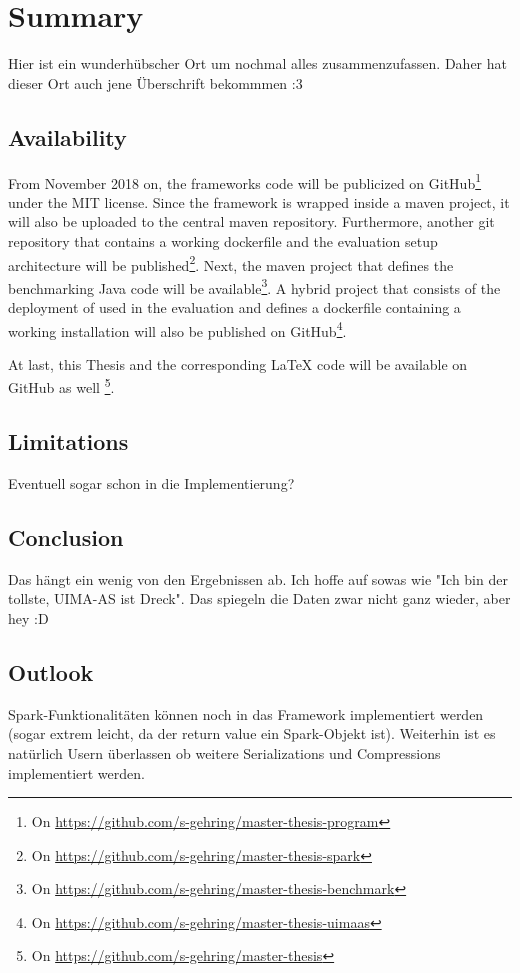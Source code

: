 \chapter{Summary}\label{ch:summary}



Hier ist ein wunderhübscher Ort um nochmal alles zusammenzufassen. Daher hat dieser Ort auch jene Überschrift bekommmen :3


\section{Availability}
From November 2018 on, the frameworks code will be publicized on GitHub\footnote{On \url{https://github.com/s-gehring/master-thesis-program}} under the MIT license. Since the framework is wrapped inside a maven project, it will also be uploaded to the central maven repository. Furthermore, another git repository that contains a working \spark{} dockerfile and the evaluation setup architecture will be published\footnote{On \url{https://github.com/s-gehring/master-thesis-spark}}. Next, the maven project that defines the benchmarking Java code will be available\footnote{On \url{https://github.com/s-gehring/master-thesis-benchmark}}. A hybrid project that consists of the deployment of \uimaas{} used in the evaluation and defines a dockerfile containing a working \uimaas{} installation will also be published on GitHub\footnote{On \url{https://github.com/s-gehring/master-thesis-uimaas}}.

At last, this Thesis and the corresponding \LaTeX{} code will be available on GitHub as well \footnote{On \url{https://github.com/s-gehring/master-thesis}}.

\section{Limitations}
Eventuell sogar schon in die Implementierung?

\section{Conclusion}

Das hängt ein wenig von den Ergebnissen ab. Ich hoffe auf sowas wie "Ich bin der tollste, UIMA-AS ist Dreck". Das spiegeln die Daten zwar nicht ganz wieder, aber hey :D

\section{Outlook}

Spark-Funktionalitäten können noch in das Framework implementiert werden (sogar extrem leicht, da der return value ein Spark-Objekt ist). Weiterhin ist es natürlich Usern überlassen ob weitere Serializations und Compressions implementiert werden.